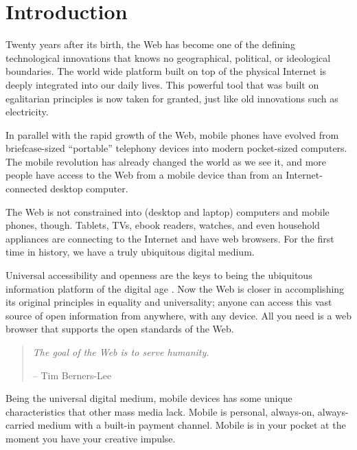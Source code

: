 \chapter{Introduction}
\label{chapter:introduction}

Twenty years after its birth, the Web has become one of the defining
technological innovations that knows no geographical, political, or
ideological boundaries. The world wide platform built on top of the
physical Internet is deeply integrated into our daily lives. This
powerful tool that was built on egalitarian principles is now taken
for granted, just like old innovations such as
electricity. \cite{berners2010long}

In parallel with the rapid growth of the Web, mobile phones have
evolved from briefcase-sized ``portable'' telephony devices into
modern pocket-sized computers. The mobile revolution has already
changed the world as we see it, and more people have access to the Web
from a mobile device than from an Internet-connected desktop
computer. \cite{fling2009mobile}

The Web is not constrained into (desktop and laptop) computers and
mobile phones, though. Tablets, TVs, ebook readers, watches, and even
household appliances are connecting to the Internet and have web
browsers. For the first time in history, we have a truly ubiquitous
digital medium. \cite{fling2009mobile}

Universal accessibility and openness are the keys to being the
ubiquitous information platform of the digital age
\cite{berners2010long}. Now the Web is closer in accomplishing its
original principles in equality and universality; anyone can access
this vast source of open information from anywhere, with any
device. All you need is a web browser that supports the open standards
of the Web.

\begin{quotation}
  \noindent \textit{The goal of the Web is to serve humanity.}
  \begin{flushright}
    -- Tim Berners-Lee \cite{berners2010long}
  \end{flushright}
\end{quotation}

Being the universal digital medium, mobile devices has some unique
characteristics that other mass media lack. Mobile is personal,
always-on, always-carried medium with a built-in payment
channel. Mobile is in your pocket at the moment you have your creative
impulse. \cite{fling2009mobile}


